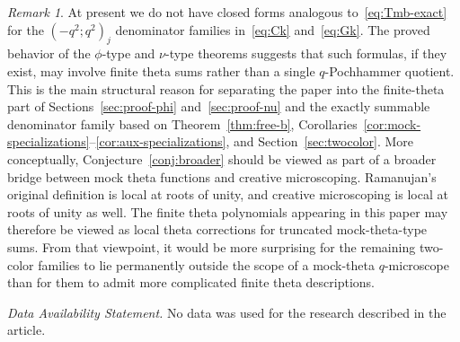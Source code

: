 \documentclass[reqno]{amsart}
\theoremstyle{definition}
\theoremstyle{plain}
\theoremstyle{remark}
\newtheorem{remark}{Remark}
\numberwithin{equation}{section}
\begin{document}
\begin{remark}
At present we do not have closed forms analogous to~\eqref{eq:Tmb-exact} for the $(-q^2;q^2)_j$ denominator families in~\eqref{eq:Ck} and~\eqref{eq:Gk}. The proved behavior of the $\phi$-type and $\nu$-type theorems suggests that such formulas, if they exist, may involve finite theta sums rather than a single $q$-Pochhammer quotient. This is the main structural reason for separating the paper into the finite-theta part of Sections~\ref{sec:proof-phi} and~\ref{sec:proof-nu} and the exactly summable denominator family based on Theorem~\ref{thm:free-b}, Corollaries~\ref{cor:mock-specializations}--\ref{cor:aux-specializations}, and Section~\ref{sec:twocolor}. More conceptually, Conjecture~\ref{conj:broader} should be viewed as part of a broader bridge between mock theta functions and creative microscoping. Ramanujan’s original definition is local at roots of unity, and creative microscoping is local at roots of unity as well. The finite theta polynomials appearing in this paper may therefore be viewed as local theta corrections for truncated mock-theta-type sums. From that viewpoint, it would be more surprising for the remaining two-color families to lie permanently outside the scope of a mock-theta $q$-microscope than for them to admit more complicated finite theta descriptions.
\end{remark}

\medskip
\noindent\textit{Data Availability Statement.} No data was used for the research described in the article.
\end{document}
